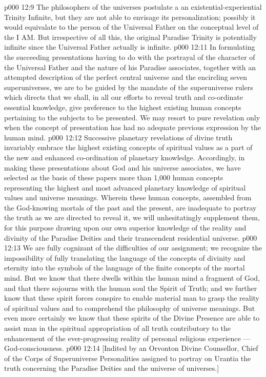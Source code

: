 \vs p000 12:9 \pc The philosophers of the universes postulate a  an existential\hyp{}experiential Trinity Infinite, but they are not able to envisage its personalization; possibly it would equivalate to the person of the Universal Father on the conceptual level of the I AM. But irrespective of all this, the original Paradise Trinity is potentially infinite since the Universal Father actually is infinite.
\vs p000 12:11 In formulating the succeeding presentations having to do with the portrayal of the character of the Universal Father and the nature of his Paradise associates, together with an attempted description of the perfect central universe and the encircling seven superuniverses, we are to be guided by the mandate of the superuniverse rulers which directs that we shall, in all our efforts to reveal truth and co\hyp{}ordinate essential knowledge, give preference to the highest existing human concepts pertaining to the subjects to be presented. We may resort to pure revelation only when the concept of presentation has had no adequate previous expression by the human mind.
\vs p000 12:12 Successive planetary revelations of divine truth invariably embrace the highest existing concepts of spiritual values as a part of the new and enhanced co\hyp{}ordination of planetary knowledge. Accordingly, in making these presentations about God and his universe associates, we have selected as the basis of these papers more than 1,000 human concepts representing the highest and most advanced planetary knowledge of spiritual values and universe meanings. Wherein these human concepts, assembled from the God\hyp{}knowing mortals of the past and the present, are inadequate to portray the truth as we are directed to reveal it, we will unhesitatingly supplement them, for this purpose drawing upon our own superior knowledge of the reality and divinity of the Paradise Deities and their transcendent residential universe.
\vs p000 12:13 We are fully cognizant of the difficulties of our assignment; we recognize the impossibility of fully translating the language of the concepts of divinity and eternity into the symbols of the language of the finite concepts of the mortal mind. But we know that there dwells within the human mind a fragment of God, and that there sojourns with the human soul the Spirit of Truth; and we further know that these spirit forces conspire to enable material man to grasp the reality of spiritual values and to comprehend the philosophy of universe meanings. But even more certainly we know that these spirits of the Divine Presence are able to assist man in the spiritual appropriation of all truth contributory to the enhancement of the ever\hyp{}progressing reality of personal religious experience --- God\hyp{}consciousness.
\vsetoff
\vs p000 12:14 [Indited by an Orvonton Divine Counsellor, Chief of the Corps of Superuniverse Personalities assigned to portray on Urantia the truth concerning the Paradise Deities and the universe of universes.]
